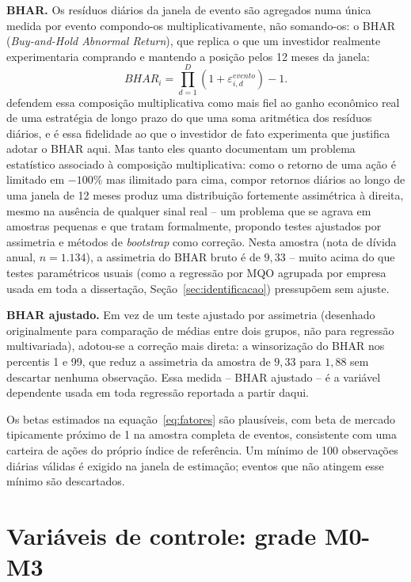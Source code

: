 \documentclass[a4paper,12pt]{report}
\begin{document}
\textbf{BHAR.} Os resíduos diários da janela de evento são agregados numa única medida por evento compondo-os multiplicativamente, não somando-os: o BHAR (\textit{Buy-and-Hold Abnormal Return}), que replica o que um investidor realmente experimentaria comprando e mantendo a posição pelos 12 meses da janela:
\begin{equation}
    \mathit{BHAR}_i = \prod_{d=1}^{D}\left(1 + \varepsilon_{i,d}^{evento}\right) - 1.
    \label{eq:bhar}
\end{equation}
 defendem essa composição multiplicativa como mais fiel ao ganho econômico real de uma estratégia de longo prazo do que uma soma aritmética dos resíduos diários, e é essa fidelidade ao que o investidor de fato experimenta que justifica adotar o BHAR aqui. Mas tanto eles quanto  documentam um problema estatístico associado à composição multiplicativa: como o retorno de uma ação é limitado em $-100\%$ mas ilimitado para cima, compor retornos diários ao longo de uma janela de 12 meses produz uma distribuição fortemente assimétrica à direita, mesmo na ausência de qualquer sinal real -- um problema que se agrava em amostras pequenas e que  tratam formalmente, propondo testes ajustados por assimetria e métodos de \textit{bootstrap} como correção. Nesta amostra (nota de dívida anual, $n=1.134$), a assimetria do BHAR bruto é de $9{,}33$ -- muito acima do que testes paramétricos usuais (como a regressão por MQO agrupada por empresa usada em toda a dissertação, Seção~\ref{sec:identificacao}) pressupõem sem ajuste.

\textbf{BHAR ajustado.} Em vez de um teste ajustado por assimetria (desenhado originalmente para comparação de médias entre dois grupos, não para regressão multivariada), adotou-se a correção mais direta: a winsorização do BHAR nos percentis 1 e 99, que reduz a assimetria da amostra de $9{,}33$ para $1{,}88$ sem descartar nenhuma observação. Essa medida -- BHAR ajustado -- é a variável dependente usada em toda regressão reportada a partir daqui.

Os betas estimados na equação~\ref{eq:fatores} são plausíveis, com beta de mercado tipicamente próximo de 1 na amostra completa de eventos, consistente com uma carteira de ações do próprio índice de referência. Um mínimo de 100 observações diárias válidas é exigido na janela de estimação; eventos que não atingem esse mínimo são descartados.

\section{Variáveis de controle: grade M0-M3}
\label{sec:controles}
\end{document}
